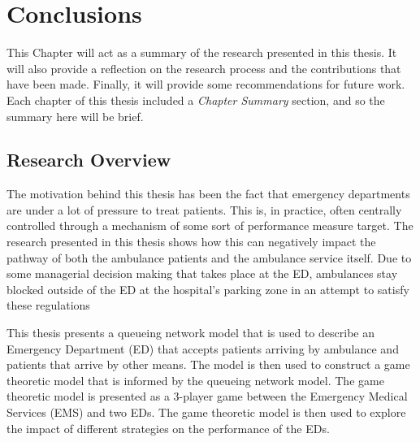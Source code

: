\chapter{Conclusions}\label{sec:conclusion}

This Chapter will act as a summary of the research presented in this thesis.
It will also provide a reflection on the research process and the
contributions that have been made.
Finally, it will provide some recommendations for future work.
Each chapter of this thesis included a \textit{Chapter Summary} section, and
so the summary here will be brief.


\section{Research Overview}

The motivation behind this thesis has been the fact that emergency departments
are under a lot of pressure to treat patients.
This is, in practice, often centrally controlled through a mechanism of some
sort of performance measure target.
The research presented in this thesis shows how this can negatively impact the
pathway of both the ambulance patients and the ambulance service itself.
Due to some managerial decision making that takes place at the ED, ambulances
stay blocked outside of the ED at the hospital's parking zone in an attempt to
satisfy these regulations

This thesis presents a queueing network model that is used to describe an
Emergency Department (ED) that accepts patients arriving by ambulance and
patients that arrive by other means.
The model is then used to construct a game theoretic model that is informed
by the queueing network model.
The game theoretic model is presented as a 3-player game between the
Emergency Medical Services (EMS) and two EDs.
The game theoretic model is then used to explore the impact of different
strategies on the performance of the EDs.

